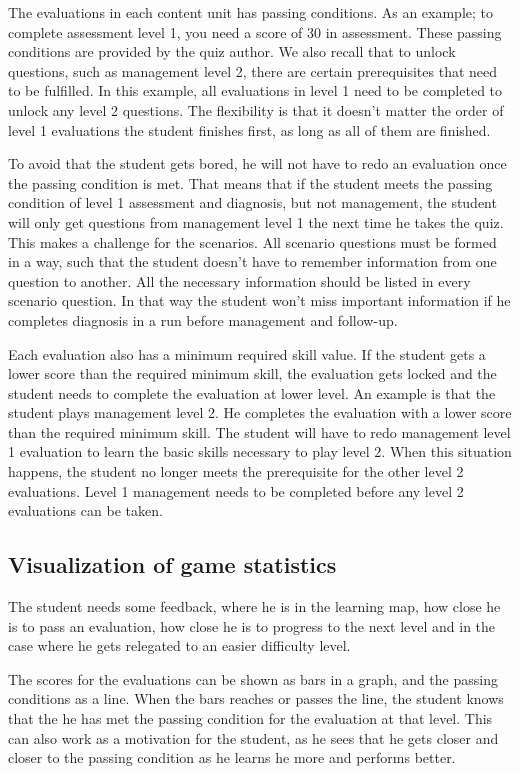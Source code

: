 The evaluations in each content unit has passing conditions. As an example; to complete assessment level 1, you need a score of 30 in assessment. These passing conditions are provided by the quiz author. We also recall that to unlock questions, such as management level 2, there are certain prerequisites that need to be fulfilled. In this example, all evaluations in level 1 need to be completed to unlock any level 2 questions. The flexibility is that it doesn't matter the order of level 1 evaluations the student finishes first, as long as all of them are finished.

To avoid that the student gets bored, he will not have to redo an evaluation once the passing condition is met. That means that if the student meets the passing condition of level 1 assessment and diagnosis, but not management, the student will only get questions from management level 1 the next time he takes the quiz. This makes a challenge for the scenarios. All scenario questions must be formed in a way, such that the student doesn't have to remember information from one question to another. All the necessary information should be listed in every scenario question. In that way the student won't miss important information if he completes diagnosis in a run before management and follow-up. 

Each evaluation also has a minimum required skill value. If the student gets a lower score than the required minimum skill, the evaluation gets locked and the student needs to complete the evaluation at lower level. An example is that the student plays management level 2. He completes the evaluation with a lower score than the required minimum skill. The student will have to redo management level 1 evaluation to learn the basic skills necessary to play level 2. When this situation happens, the student no longer meets the prerequisite for the other level 2 evaluations. Level 1 management needs to be completed before any level 2 evaluations can be taken. 


\subsection{Visualization of game statistics}
The student needs some feedback, where he is in the learning map, how close he is to pass an evaluation, how close he is to progress to the next level and in the case where he gets relegated to an easier difficulty level.

The scores for the evaluations can be shown as bars in a graph, and the passing conditions as a line. When the bars reaches or passes the line, the student knows that the he has met the passing condition for the evaluation at that level. This can also work as a motivation for the student, as he sees that he gets closer and closer to the passing condition as he learns he more and performs better.

